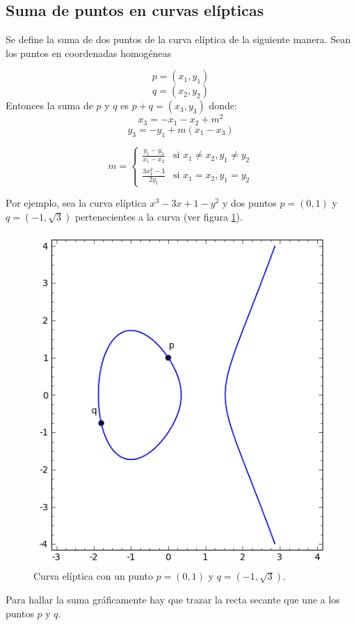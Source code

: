 \documentclass[a4,12pt]{article}
\begin{document}
\subsection{Suma de puntos en curvas elípticas}

Se define la suma de dos puntos de la curva elíptica de la siguiente manera. Sean los puntos en coordenadas homogéneas

$$p=(x_1,y_1)$$ $$ q=(x_2,y_2)$$ 
Entonces la suma de $p$ y $q$ es $ p+q=(x_3,y_3)$ donde: $$ x_3=-x_1-x_2+m^2 $$ $$ y_3=-y_1+m(x_1-x_3) $$

$$ m=
\left\{
	\begin{array}{ll}
		\frac{y_1-y_2}{x_1-x_2}  & \mbox{si } x_1\neq x_2,y_1\neq y_2  \\
		\frac{3x_1^2-3}{2y_1} & \mbox{si }  x_1=x_2,y_1=y_2
	\end{array}
\right.
$$

Por ejemplo, sea la curva elíptica $x^3-3x+1-y^2$ y dos puntos $p=(0,1)$ y $q=(-1,\sqrt{3})$ pertenecientes a la curva (ver figura \ref{fig:sumapuntos}).

\begin{figure}[h]
\begin{center}
\includegraphics[width=.5\linewidth]{imagenes/sumapuntos}
\end{center}
\caption{Curva elíptica con un punto $p=(0,1)$ y $q=(-1,\sqrt{3})$.}
\label{fig:sumapuntos}
\end{figure}

Para hallar la suma gráficamente hay que trazar la recta secante que une a los puntos $p$ y $q$.
\end{document}
